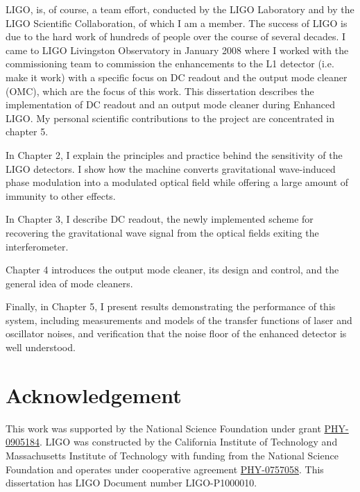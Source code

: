 LIGO, is, of course, a team effort, conducted by the LIGO Laboratory
and by the LIGO Scientific Collaboration, of which I am a member.  The
success of LIGO is due to the hard work of hundreds of people over the
course of several decades.  I came to LIGO Livingston Observatory in
January 2008 where I worked with the commissioning team to commission
the enhancements to the L1 detector (i.e. make it work) with a
specific focus on DC readout and the output mode cleaner (OMC), which
are the focus of this work.  This dissertation describes the
implementation of DC readout and an output mode cleaner during
Enhanced LIGO.  My personal scientific contributions to the project
are concentrated in chapter 5.

In Chapter 2, I explain the principles and practice behind the
sensitivity of the LIGO detectors.  I show how the machine converts
gravitational wave-induced phase modulation into a modulated optical
field while offering a large amount of immunity to other effects.

In Chapter 3, I describe DC readout, the newly implemented scheme
for recovering the gravitational wave signal from the optical fields
exiting the interferometer.

Chapter 4 introduces the output mode cleaner, its design and control,
and the general idea of mode cleaners.

Finally, in Chapter 5, I present results demonstrating the performance
of this system, including measurements and models of the transfer functions
of laser and oscillator noises, and verification that the noise floor
of the enhanced detector is well understood.


\section{Acknowledgement}

This work was supported by the National Science Foundation under grant
\href{http://www.nsf.gov/awardsearch/showAward.do?AwardNumber=0905184}{PHY-0905184}.
LIGO was constructed by the California Institute of Technology and
Massachusetts Institute of Technology with funding from the National
Science Foundation and operates under cooperative agreement
\href{http://www.nsf.gov/awardsearch/showAward.do?AwardNumber=0757058}{PHY-0757058}.
This dissertation has LIGO Document number LIGO-P1000010.
